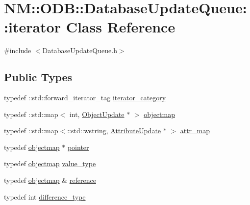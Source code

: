 \hypertarget{class_n_m_1_1_o_d_b_1_1_database_update_queue_1_1iterator}{}\section{N\+M\+:\+:O\+D\+B\+:\+:Database\+Update\+Queue\+:\+:iterator Class Reference}
\label{class_n_m_1_1_o_d_b_1_1_database_update_queue_1_1iterator}


{\ttfamily \#include $<$Database\+Update\+Queue.\+h$>$}

\subsection*{Public Types}
\begin{DoxyCompactItemize}
\item 
typedef \+::std\+::forward\+\_\+iterator\+\_\+tag \hyperlink{class_n_m_1_1_o_d_b_1_1_database_update_queue_1_1iterator_add6003c575e89d3573a3de306ef4b0f0}{iterator\+\_\+category}
\item 
typedef \+::std\+::map$<$ int, \hyperlink{class_n_m_1_1_o_d_b_1_1_object_update}{Object\+Update} $\ast$ $>$ \hyperlink{class_n_m_1_1_o_d_b_1_1_database_update_queue_1_1iterator_a4951d6dfa3ad7586cce163d30c3331d6}{objectmap}
\item 
typedef \+::std\+::map$<$\+::std\+::wstring, \hyperlink{class_n_m_1_1_o_d_b_1_1_attribute_update}{Attribute\+Update} $\ast$ $>$ \hyperlink{class_n_m_1_1_o_d_b_1_1_database_update_queue_1_1iterator_a6faa13ae9c82d09c665a93e670bdf834}{attr\+\_\+map}
\item 
typedef \hyperlink{class_n_m_1_1_o_d_b_1_1_database_update_queue_1_1iterator_a4951d6dfa3ad7586cce163d30c3331d6}{objectmap} $\ast$ \hyperlink{class_n_m_1_1_o_d_b_1_1_database_update_queue_1_1iterator_a7e0e43f97e56b1be581d21297b8b3f44}{pointer}
\item 
typedef \hyperlink{class_n_m_1_1_o_d_b_1_1_database_update_queue_1_1iterator_a4951d6dfa3ad7586cce163d30c3331d6}{objectmap} \hyperlink{class_n_m_1_1_o_d_b_1_1_database_update_queue_1_1iterator_a66a74e1a4ccceab5c6c90021140dcc41}{value\+\_\+type}
\item 
typedef \hyperlink{class_n_m_1_1_o_d_b_1_1_database_update_queue_1_1iterator_a4951d6dfa3ad7586cce163d30c3331d6}{objectmap} \& \hyperlink{class_n_m_1_1_o_d_b_1_1_database_update_queue_1_1iterator_a56732f54ef4ebd0af68d39345843140e}{reference}
\item 
typedef int \hyperlink{class_n_m_1_1_o_d_b_1_1_database_update_queue_1_1iterator_ae438f0fd65eabcca2f4f006a459a2665}{difference\+\_\+type}
\end{DoxyCompactItemize}
